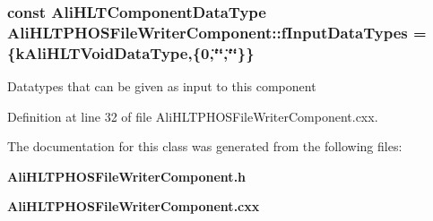 \subsubsection{\setlength{\rightskip}{0pt plus 5cm}const {\bf Ali\-HLTComponent\-Data\-Type} {\bf Ali\-HLTPHOSFile\-Writer\-Component::f\-Input\-Data\-Types} = \{{\bf k\-Ali\-HLTVoid\-Data\-Type},\{0,\char`\"{}\char`\"{},\char`\"{}\char`\"{}\}\}\hspace{0.3cm}{\tt  [static, private]}}\label{classAliHLTPHOSFileWriterComponent_v0}


Datatypes that can be given as input to this component 

Definition at line 32 of file Ali\-HLTPHOSFile\-Writer\-Component.cxx.

The documentation for this class was generated from the following files:\begin{CompactItemize}
\item 
{\bf Ali\-HLTPHOSFile\-Writer\-Component.h}\item 
{\bf Ali\-HLTPHOSFile\-Writer\-Component.cxx}\end{CompactItemize}
